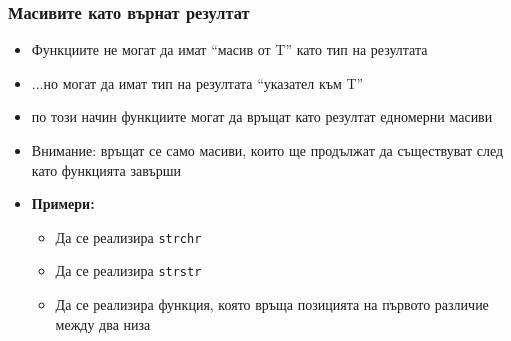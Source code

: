 \documentclass[alsotrans]{beamerswitch}
\begin{document}
\begin{frame}
  \frametitle{Масивите като върнат резултат}

  \begin{itemize}[<+->]
  \item Функциите \alert{не могат} да имат ``масив от T'' като тип на резултата
  \item ...но могат да имат тип на резултата ``указател към T''
  \item по този начин функциите могат да връщат като резултат \alert{едномерни масиви}
  \item \alert{Внимание:} връщат се само масиви, които ще продължат да съществуват след като функцията завърши
  \item \textbf{Примери:}
    \begin{itemize}
    \item Да се реализира \tt{strchr}
    \item Да се реализира \tt{strstr}
    \item Да се реализира функция, която връща позицията на първото различие между два низа
    \end{itemize}
  \end{itemize}
\end{frame}
\end{document}
